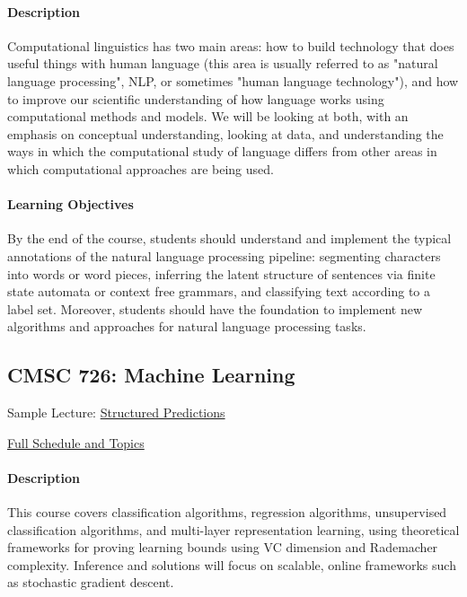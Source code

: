 \documentclass{article}
\begin{document}
\paragraph{Description}
Computational linguistics has two main areas: how to build technology that does useful things with human language (this area is usually referred to as "natural language processing", NLP, or sometimes "human language technology"), and how to improve our scientific understanding of how language works using computational methods and models. We will be looking at both, with an emphasis on conceptual understanding, looking at data, and understanding the ways in which the computational study of language differs from other areas in which computational approaches are being used.

\paragraph{Learning Objectives}
By the end of the course, students should understand and implement the typical annotations of the natural language processing pipeline: segmenting characters into words or word pieces, inferring the latent structure of sentences via finite state automata or context free grammars, and classifying text according to a label set.  Moreover, students should have the foundation to implement new algorithms and approaches for natural language processing tasks.


\subsection{CMSC 726: Machine Learning}

\begin{itemize*}
  \item Sample Lecture: \href{https://www.youtube.com/watch?v=Ju2z_WjrIOY}{Structured Predictions}
  \item \href{http://users.umiacs.umd.edu/~jbg/teaching/CMSC_726/}{Full Schedule and Topics}
\end{itemize*}

\paragraph{Description}
This course covers classification algorithms, regression algorithms, unsupervised classification algorithms, and multi-layer representation learning, using theoretical frameworks for proving learning bounds using VC dimension and Rademacher complexity.  Inference and solutions will focus on scalable, online frameworks such as stochastic gradient descent.
\end{document}
